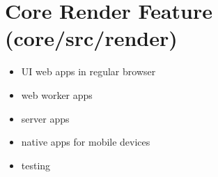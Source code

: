 \section{Core Render Feature (core/src/render)}





\begin{itemize}
  \item UI web apps in regular browser
  \item web worker apps
  \item server apps
  \item native apps for mobile devices
  \item testing
\end{itemize}


